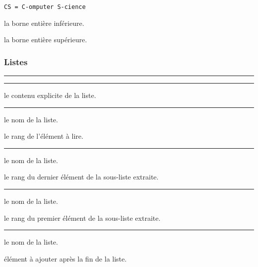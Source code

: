 \documentclass[12pt,a4paper]{article}
\theoremstyle{definition}
\newcommand\separation{
    \medskip
    \hfill\rule{0.5\textwidth}{0.75pt}\hfill
    \medskip
}
\newcommand\prefix[1]{%
    \texttt{#1}%
}
\begin{document}
   \hfill \prefix{CS = C-omputer S-cience}

 la borne entière inférieure.

 la borne entière supérieure.





\subsubsection{Listes}







\separation






\separation



\IDarg{} le contenu explicite de la liste.




\separation



 le nom de la liste.

 le rang de l'élément à lire.




\separation



 le nom de la liste.

 le rang du dernier élément de la sous-liste extraite.




\separation



 le nom de la liste.

 le rang du premier élément de la sous-liste extraite.




\separation





 le nom de la liste.

 élément à ajouter après la fin de la liste.
\end{document}
